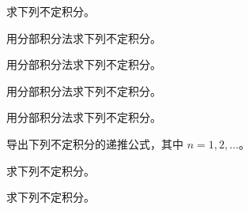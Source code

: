 \noindent\begin{minipage}{\textwidth}
求下列不定积分。
\end{minipage}\par\vfill
\noindent\begin{minipage}{\textwidth}
用分部积分法求下列不定积分。
\end{minipage}\par\vfill
\noindent\begin{minipage}{\textwidth}
用分部积分法求下列不定积分。
\end{minipage}\par\vfill
\newpage
\noindent\begin{minipage}{\textwidth}
用分部积分法求下列不定积分。
\end{minipage}\par\vfill
\noindent\begin{minipage}{\textwidth}
用分部积分法求下列不定积分。
\end{minipage}\par\vfill
\noindent\begin{minipage}{\textwidth}
导出下列不定积分的递推公式，其中 $n=1,2,\ldots$。
\end{minipage}\par\vfill
\noindent\begin{minipage}{\textwidth}
求下列不定积分。
\end{minipage}\par\vfill
\newpage
\noindent\begin{minipage}{\textwidth}
求下列不定积分。
\end{minipage}\par\vfill
